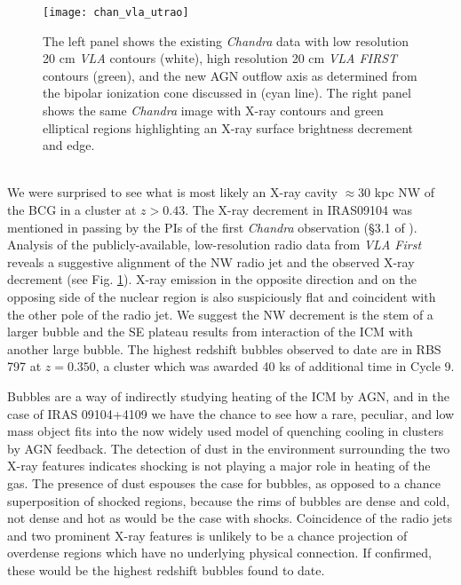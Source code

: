 \documentclass[letterpaper,11pt,twocolumn]{article}
\begin{document}
\begin{figure}
\begin{center}
\texttt{[image: chan\_vla\_utrao]}
\caption{
The left panel shows the existing {\textit{Chandra}} data with low
resolution 20 cm {\it{VLA}} contours (white), high resolution 20 cm
{\it{VLA FIRST}} contours (green), and the new AGN outflow axis as
determined from the bipolar ionization cone discussed in
\cite{1999ApJ...512..145H} (cyan line). The right panel shows the same
{\textit{Chandra}} image with X-ray contours and green elliptical
regions highlighting an X-ray surface brightness decrement and edge.
}
\label{fig:chanrad}
\end{center}
\end{figure}

\\
We were surprised to see what is most likely an X-ray cavity $\approx
30$ kpc NW of the BCG in a cluster at $z > 0.43$. The X-ray decrement
in IRAS09104 was mentioned in passing by the PIs of the first
{\textit{Chandra}} observation (\S{3.1} of
\cite{2001MNRAS.321L..15I}). Analysis of the publicly-available,
low-resolution radio data from {\it{VLA First}} reveals a suggestive
alignment of the NW radio jet and the observed X-ray decrement (see
Fig. \ref{fig:chanrad}). X-ray emission in the opposite direction and
on the opposing side of the nuclear region is also suspiciously flat
and coincident with the other pole of the radio jet. We suggest the NW
decrement is the stem of a larger bubble and the SE plateau results
from interaction of the ICM with another large bubble. The highest
redshift bubbles observed to date are in RBS 797 at $z = 0.350$, a
cluster which was awarded 40 ks of additional time in Cycle 9.

Bubbles are a way of indirectly studying heating of the ICM by AGN,
and in the case of IRAS 09104+4109 we have the chance to see how a
rare, peculiar, and low mass object fits into the now widely used
model of quenching cooling in clusters by AGN feedback. The detection
of dust in the environment surrounding the two X-ray features
indicates shocking is not playing a major role in heating of the
gas. The presence of dust espouses the case for bubbles, as opposed to
a chance superposition of shocked regions, because the rims of bubbles
are dense and cold, not dense and hot as would be the case with
shocks. Coincidence of the radio jets and two prominent X-ray features
is unlikely to be a chance projection of overdense regions which have
no underlying physical connection. If confirmed, these would be the
highest redshift bubbles found to date.\\
\end{document}
